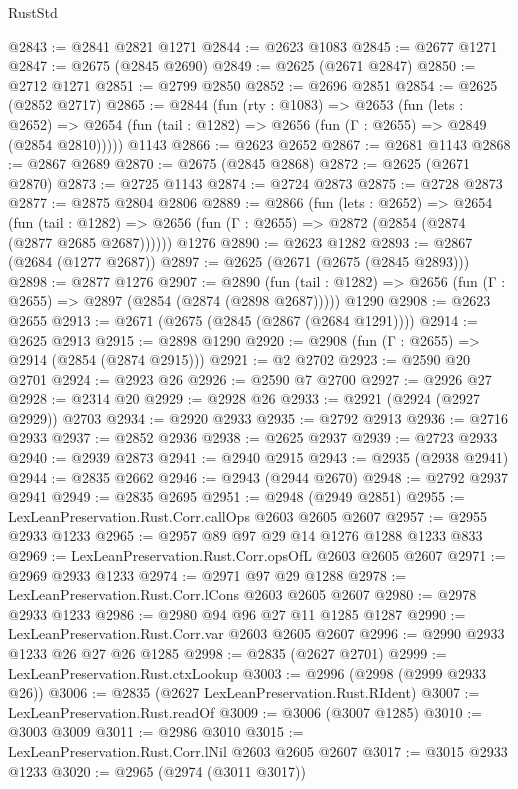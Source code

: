 \begin{lexlean}{RustStd}
\begin{coremodule}
@2843 := @2841 @2821 @1271
@2844 := @2623 @1083
@2845 := @2677 @1271
@2847 := @2675 (@2845 @2690)
@2849 := @2625 (@2671 @2847)
@2850 := @2712 @1271
@2851 := @2799 @2850
@2852 := @2696 @2851
@2854 := @2625 (@2852 @2717)
@2865 := @2844
    (fun (rty : @1083) =>
    @2653
      (fun (lets : @2652) =>
      @2654 (fun (tail : @1282) => @2656 (fun (Γ : @2655) => @2849 (@2854 @2810)))))
    @1143
@2866 := @2623 @2652
@2867 := @2681 @1143
@2868 := @2867 @2689
@2870 := @2675 (@2845 @2868)
@2872 := @2625 (@2671 @2870)
@2873 := @2725 @1143
@2874 := @2724 @2873
@2875 := @2728 @2873
@2877 := @2875 @2804 @2806
@2889 := @2866
    (fun (lets : @2652) =>
    @2654
      (fun (tail : @1282) => @2656 (fun (Γ : @2655) => @2872 (@2854 (@2874 (@2877 @2685 @2687))))))
    @1276
@2890 := @2623 @1282
@2893 := @2867 (@2684 (@1277 @2687))
@2897 := @2625 (@2671 (@2675 (@2845 @2893)))
@2898 := @2877 @1276
@2907 := @2890
    (fun (tail : @1282) => @2656 (fun (Γ : @2655) => @2897 (@2854 (@2874 (@2898 @2687)))))
    @1290
@2908 := @2623 @2655
@2913 := @2671 (@2675 (@2845 (@2867 (@2684 @1291))))
@2914 := @2625 @2913
@2915 := @2898 @1290
@2920 := @2908 (fun (Γ : @2655) => @2914 (@2854 (@2874 @2915)))
@2921 := @2 @2702
@2923 := @2590 @20 @2701
@2924 := @2923 @26
@2926 := @2590 @7 @2700
@2927 := @2926 @27
@2928 := @2314 @20
@2929 := @2928 @26
@2933 := @2921 (@2924 (@2927 @2929)) @2703
@2934 := @2920 @2933
@2935 := @2792 @2913
@2936 := @2716 @2933
@2937 := @2852 @2936
@2938 := @2625 @2937
@2939 := @2723 @2933
@2940 := @2939 @2873
@2941 := @2940 @2915
@2943 := @2935 (@2938 @2941)
@2944 := @2835 @2662
@2946 := @2943 (@2944 @2670)
@2948 := @2792 @2937 @2941
@2949 := @2835 @2695
@2951 := @2948 (@2949 @2851)
@2955 := LexLeanPreservation.Rust.Corr.callOps @2603 @2605 @2607
@2957 := @2955 @2933 @1233
@2965 := @2957 @89 @97 @29 @14 @1276 @1288 @1233 @833
@2969 := LexLeanPreservation.Rust.Corr.opsOfL @2603 @2605 @2607
@2971 := @2969 @2933 @1233
@2974 := @2971 @97 @29 @1288
@2978 := LexLeanPreservation.Rust.Corr.lCons @2603 @2605 @2607
@2980 := @2978 @2933 @1233
@2986 := @2980 @94 @96 @27 @11 @1285 @1287
@2990 := LexLeanPreservation.Rust.Corr.var @2603 @2605 @2607
@2996 := @2990 @2933 @1233 @26 @27 @26 @1285
@2998 := @2835 (@2627 @2701)
@2999 := LexLeanPreservation.Rust.ctxLookup
@3003 := @2996 (@2998 (@2999 @2933 @26))
@3006 := @2835 (@2627 LexLeanPreservation.Rust.RIdent)
@3007 := LexLeanPreservation.Rust.readOf
@3009 := @3006 (@3007 @1285)
@3010 := @3003 @3009
@3011 := @2986 @3010
@3015 := LexLeanPreservation.Rust.Corr.lNil @2603 @2605 @2607
@3017 := @3015 @2933 @1233
@3020 := @2965 (@2974 (@3011 @3017))

\end{coremodule}
\end{lexlean}
